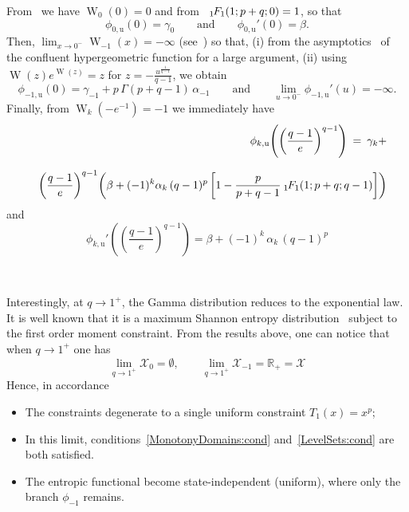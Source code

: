\documentclass[entropy,article,submit,moreauthors,pdftex]{Definitions/mdpi}
\def\Rset{\mathbb{R}}%
\def\X{\mathcal{X}}%
\def\W{\operatorname{W}} %
\newcommand{\hypgeom}[2]{\mbox{}_{#1}\hspace{-1pt}F_{#2}}%
\def\u{\mathrm{u}}
\begin{document}
From~\cite[Eq.~3.1]{CorGon96}     we     have      $\W_0(0)     =     0$     and
from~\cite[Eq.~13.1.2]{AbrSte70} $\hypgeom{1}{1}(1 ; p+q ; 0) = 1$, so that
%
\[
\phi_{0,\u}(0) = \gamma_0 \qquad \mbox{and} \qquad \phi_{0,\u}'(0) = \beta.
\]
%
Then, $\displaystyle \lim_{x  \to 0^-} \W_{-1}(x) =  - \infty$ (see~\cite[Fig.~1
  or       Eq.~4.18]{CorGon96})      so       that,      (i)       from      the
asymptotics~\cite[Eq.~13.1.4]{AbrSte70} of the confluent hypergeometric function
for  a  large  argument,   (ii)  using  $\W(z)  e^{\W(z)}  =  z$   for  $z  =  -
\frac{u^{\frac{1}{q-1}}}{q-1}$, we obtain
%
\[
\phi_{-1,\u}(0)  =  \gamma_{-1}  +  p \,  \Gamma(p+q-1)  \,  \alpha_{-1}  \qquad
\mbox{and} \qquad \lim_{u \to 0^-} \phi_{-1,\u}'(u) = -\infty.
\]
%
Finally, from $\W_k(-e^{-1}) = -1$ we immediately have
%
\begin{eqnarray*}
  && \phi_{k,\u}\left( \left( \frac{q-1}{e} \right)^{q-1} \right) \: = \:
  \gamma_k +
  \\[2.5mm]
  && \left( \frac{q-1}{e} \right)^{q-1} \left( \beta + (-1)^k \alpha_k \,
  (q-1)^p \, \left[ 1 - \frac{p}{p+q-1} \: \hypgeom{1}{1}\left( 1 ; p+q ; q-1
    \right) \right] \right)
\end{eqnarray*}
%
and
%
\[
\phi_{k,\u}'\left( \left(  \frac{q-1}{e} \right)^{q-1} \right) =  \beta + (-1)^k
\, \alpha_k \, (q-1)^p
\]

\

Interestingly, at $q \to 1^+$, the Gamma distribution reduces to the exponential
law.   It   is   well   known   that   it   is   a   maximum   Shannon   entropy
distribution~\cite{CovTho06} subject to the first order moment constraint.  From
the results above, one can notice that when $q \to 1^+$ one has
%
\[
\lim_{q \to 1^+} \X_0  = \emptyset, \qquad \lim_{q \to 1^+}  \X_{-1} = \Rset_+ =
\X
\]
%
Hence, in accordance
%
\begin{itemize}
\item The constraints degenerate to a single uniform constraint $T_1(x) = x^p$;
%
\item       In      this       limit,      conditions~\ref{MonotonyDomains:cond}
  and~\ref{LevelSets:cond} are both satisfied.
%
\item The entropic functional become state-independent (uniform), where only the
  branch $\phi_{-1}$ remains.
%
\end{itemize}
\end{document}
